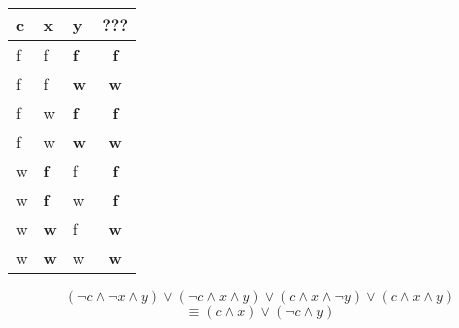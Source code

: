 \documentclass[a4paper]{article}
\begin{document}
	\begin{center}
		\begin{tabular}{|l|l|l|c|}
			\firsthline
				c & x & y & ??? \\
			\hline
				f & f & \textbf{f} & \textbf{f} \\
				f & f & \textbf{w} & \textbf{w} \\
				f & w & \textbf{f} & \textbf{f} \\
				f & w & \textbf{w} & \textbf{w} \\
				w & \textbf{f} & f & \textbf{f} \\
				w & \textbf{f} & w & \textbf{f} \\
				w & \textbf{w} & f & \textbf{w} \\
				w & \textbf{w} & w & \textbf{w} \\
			\hline
		\end{tabular}
	\end{center}
	
	\begin{equation*}
		(\lnot c \land \lnot x \land y) \lor (\lnot c \land x \land y) \lor (c \land x \land \lnot y) \lor (c \land x \land y)
	\end{equation*}
	\begin{equation*}
		\equiv (c \land x) \lor (\lnot c \land y)
	\end{equation*}
\end{document}
